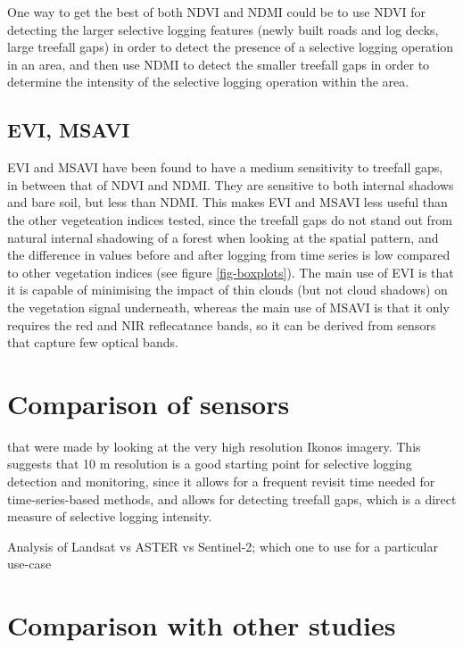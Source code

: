 \documentclass[a4paper,12pt]{scrbook}
\begin{document}
One way to get the best of both \ac{NDVI} and \ac{NDMI} could be to use \ac{NDVI} for detecting the larger selective logging features (newly built roads and log decks, large treefall gaps) in order to detect the presence of a selective logging operation in an area, and then use \ac{NDMI} to detect the smaller treefall gaps in order to determine the intensity of the selective logging operation within the area.

\subsection{EVI, MSAVI}

\ac{EVI} and \ac{MSAVI} have been found to have a medium sensitivity to treefall gaps, in between that of \ac{NDVI} and \ac{NDMI}. They are sensitive to both internal shadows and bare soil, but less than \ac{NDMI}. This makes \ac{EVI} and \ac{MSAVI} less useful than the other vegeteation indices tested, since the treefall gaps do not stand out from natural internal shadowing of a forest when looking at the spatial pattern, and the difference in values before and after logging from time series is low compared to other vegetation indices (see figure \ref{fig-boxplots}). The main use of \ac{EVI} is that it is capable of minimising the impact of thin clouds (but not cloud shadows) on the vegetation signal underneath, whereas the main use of \ac{MSAVI} is that it only requires the red and \ac{NIR} reflecatance bands, so it can be derived from sensors that capture few optical bands.

\section{Comparison of sensors}

\citet{read_spatial_2003} that were made by looking at the very high resolution Ikonos imagery. This suggests that 10 m resolution is a good starting point for selective logging detection and monitoring, since it allows for a frequent revisit time needed for time-series-based methods, and allows for detecting treefall gaps, which is a direct measure of selective logging intensity.

Analysis of Landsat vs ASTER vs Sentinel-2; which one to use for a particular use-case

\section{Comparison with other studies}
\end{document}
